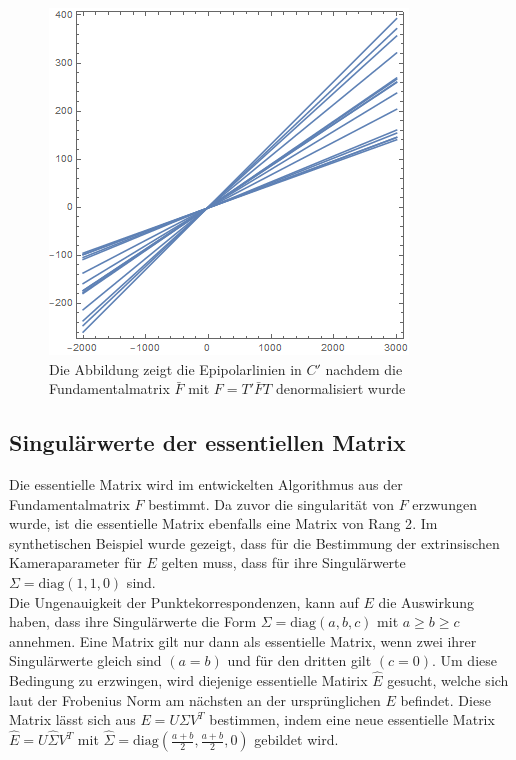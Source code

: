 \begin{figure}[!htb]
	\includegraphics[width=\linewidth]{images/LPrime_PC2_F_Constraint_denormalized.png}
	\caption[Epipolarlinien in $C$ aus singulärer denormalisierter Fundamentalmatrix]{Die Abbildung zeigt die Epipolarlinien in $C'$ nachdem die Fundamentalmatrix $\bar{F}$ mit $F = T'\bar{F}T$ denormalisiert wurde}
	\label{fig:EpipoleWithF2Denorm}
	\endminipage\hfill
\end{figure}

\pagebreak

\subsection{Singulärwerte der essentiellen Matrix}

Die essentielle Matrix wird im entwickelten Algorithmus aus der Fundamentalmatrix $F$ bestimmt. Da zuvor die singularität von $F$ erzwungen wurde, ist die essentielle Matrix ebenfalls eine Matrix von Rang 2\cite{HZ}. Im synthetischen Beispiel wurde gezeigt, dass für die Bestimmung der extrinsischen Kameraparameter für $E$ gelten muss, dass für ihre Singulärwerte $\Sigma = \text{diag}(1,1,0)$ sind. \\

Die Ungenauigkeit der Punktekorrespondenzen, kann auf $E$ die Auswirkung haben, dass ihre Singulärwerte die Form $\Sigma = \text{diag}(a,b,c)$ mit $a \geq b \geq c$ annehmen. Eine Matrix gilt nur dann als essentielle Matrix, wenn zwei ihrer Singulärwerte gleich sind $(a = b)$ und für den dritten gilt $(c=0)$. Um diese Bedingung zu erzwingen, wird diejenige essentielle Matirix $\hat{E}$ gesucht, welche sich laut der Frobenius Norm am nächsten an der ursprünglichen $E$ befindet\cite{HZ,Ferid}. Diese Matrix lässt sich aus $E = U \Sigma V^T$ bestimmen, indem eine neue essentielle Matrix $\hat{E} = U \hat{\Sigma}V^T$ mit $\hat{\Sigma} = \text{diag}(\frac{a+b}{2},\frac{a+b}{2},0)$\cite{HZ} gebildet wird.\\

